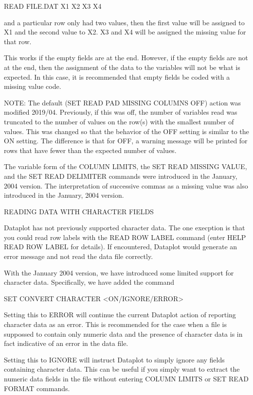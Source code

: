            READ FILE.DAT X1 X2 X3 X4

       and a particular row only had two values, then the first value
       will be assigned to X1 and the second value to X2.  X3 and X4
       will be assigned the missing value for that row.

       This works if the empty fields are at the end.  However, if
       the empty fields are not at the end, then the assignment of
       the data to the variables will not be what is expected.  In
       this case, it is recommended that empty fields be coded with
       a missing value code.

       NOTE: The default (SET READ PAD MISSING COLUMNS OFF) action
             was modified 2019/04.  Previously, if this was off,
             the number of variables read was truncated to the
             number of values on the row(s) with the smallest number
             of values.  This was changed so that the behavior of
             the OFF setting is similar to the ON setting.  The
             difference is that for OFF, a warning message will be
             printed for rows that have fewer than the expected
             number of values.

The variable form of the COLUMN LIMITS, the SET READ MISSING VALUE, and
the SET READ DELIMITER commands were introduced in the January, 2004
version.  The interpretation of successive commas as a missing value was
also introduced in the January, 2004 version.


READING DATA WITH CHARACTER FIELDS

Dataplot has not previously supported character data.  The one
execption is that you could read row labels with the READ ROW LABEL
command (enter HELP READ ROW LABEL for details).  If encountered,
Dataplot would generate an error message and not read the data file
correctly. 

With the January 2004 version, we have introduced some limited
support for character data.  Specifically, we have added the command

     SET CONVERT CHARACTER <ON/IGNORE/ERROR>

Setting this to ERROR will continue the current Dataplot action of
reporting character data as an error.  This is recommended for the
case when a file is suppossed to contain only numeric data and the
presence of character data is in fact indicative of an error in the
data file.

Setting this to IGNORE will instruct Dataplot to simply ignore any
fields containing character data.  This can be useful if you simply
want to extract the numeric data fields in the file without
entering COLUMN LIMITS or SET READ FORMAT commands.

